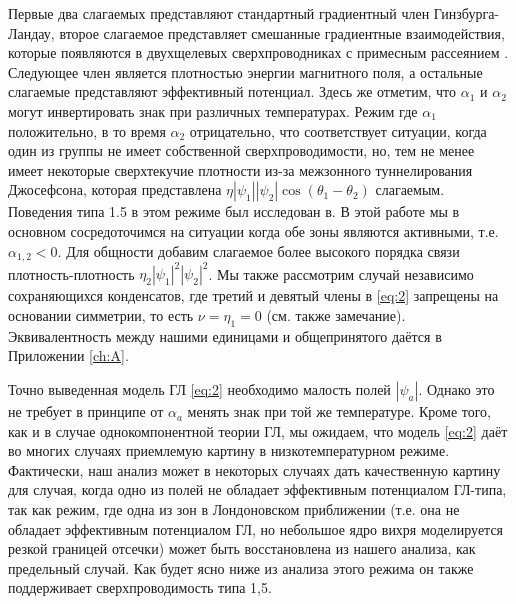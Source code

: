 Первые два слагаемых представляют стандартный градиентный член 
Гинзбурга-Ландау, второе слагаемое представляет смешанные градиентные 
взаимодействия, которые появляются в двухщелевых сверхпроводниках с примесным 
рассеянием \cite{bib:8,bib:9}. Следующее член является плотностью энергии 
магнитного поля, а остальные слагаемые представляют эффективный потенциал. 
Здесь же отметим, что \( \alpha_1 \) и \( \alpha_2 \) могут инвертировать знак 
при различных температурах. Режим где \( \alpha_1 \) положительно, в то время 
\( \alpha_2 \) отрицательно, что соответствует ситуации, когда один из группы 
не имеет собственной сверхпроводимости, но, тем не менее имеет некоторые 
сверхтекучие плотности из-за межзонного туннелирования Джосефсона, которая 
представлена \( \eta|\psi_1||\psi_2|\cos(\theta_1-\theta_2) \) слагаемым. 
Поведения типа 1.5 в этом режиме был исследован в\cite{bib:2}. В этой работе 
мы в основном сосредоточимся на ситуации когда обе зоны являются активными, 
т.е. \( \alpha_{1,2} < 0 \). Для общности добавим слагаемое более высокого 
порядка связи плотность-плотность \( \eta_2|\psi_1|^2|\psi_2|^2 \). Мы также 
рассмотрим случай независимо сохраняющихся конденсатов, где третий и девятый 
члены в \eqref{eq:2} запрещены на основании симметрии, то есть 
\( \nu = \eta_1 = 0 \) (см. также замечание\cite{bib:21}). Эквивалентность 
между нашими единицами и общепринятого даётся в Приложении \ref{ch:A}.

Точно выведенная модель ГЛ \eqref{eq:2} необходимо малость полей 
\( |\psi_a| \). Однако это не требует в принципе от \( \alpha_a \) менять знак 
при той же температуре. Кроме того, как и в случае однокомпонентной теории ГЛ, 
мы ожидаем, что модель \eqref{eq:2} даёт во многих случаях приемлемую картину 
в низкотемпературном режиме. Фактически, наш анализ может в некоторых случаях 
дать качественную картину для случая, когда одно из полей не обладает 
эффективным потенциалом ГЛ-типа, так как режим, где одна из зон в Лондоновском 
приближении (т.е. она не обладает эффективным потенциалом ГЛ, но небольшое ядро 
вихря моделируется резкой границей отсечки) может быть восстановлена из 
нашего анализа, как предельный случай. Как будет ясно ниже из анализа этого 
режима он также поддерживает сверхпроводимость типа 1,5.

